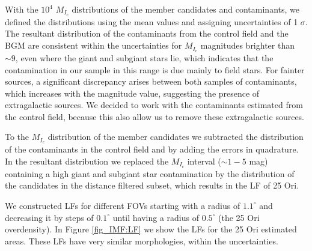 \documentclass[12pt]{article}
\begin{document}
With the $10^4$ $M_{I_c}$ distributions of the member candidates and contaminants, we defined the distributions using the mean values and assigning uncertainties of 1 $\sigma$. The resultant distribution of the contaminants from the control field and the BGM are consistent within the uncertainties for $M_{I_c}$ magnitudes brighter than $\sim 9$, even where the giant and subgiant stars lie, which indicates that the contamination in our sample in this range is due mainly to field stars. For fainter sources, a significant discrepancy arises between both samples of contaminants, which increases with the magnitude value, suggesting the presence of extragalactic sources. We decided to work with the contaminants estimated from the control field, because this also allow us to remove these extragalactic sources.

To the $M_{I_c}$ distribution of the member candidates we subtracted the distribution of the contaminants in the control field and by adding the errors in quadrature. In the resultant distribution we replaced the $M_{I_c}$ interval ($\sim1-5$ mag) containing a high giant and subgiant star contamination by the distribution of the candidates in the distance filtered subset, which results in the LF of 25 Ori.

We constructed LFs for different FOVs starting with a radius of $1.1^\circ$ and decreasing it by steps of $0.1^\circ$ until having a radius of $0.5^\circ$ (the 25 Ori overdensity). In Figure \ref{fig_IMF:LF} we show the LFs for the 25 Ori estimated areas. These LFs have very similar morphologies, within the uncertainties.
\end{document}
